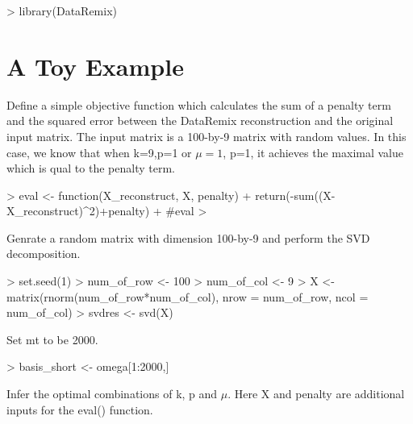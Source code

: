 \documentclass{article}
\begin{document}


\begin{Schunk}
\begin{Sinput}
> library(DataRemix)
\end{Sinput}
\end{Schunk}
\section{A Toy Example}
Define a simple objective function which calculates the sum of a penalty term and the squared error between the DataRemix reconstruction and the original input matrix. The input matrix is a 100-by-9 matrix with random values. In this case, we know that when k=9,p=1 or $\mu=1$, p=1, it achieves the maximal value which is qual to the penalty term.
\begin{Schunk}
\begin{Sinput}
> eval <- function(X_reconstruct, X, penalty){
+   return(-sum((X-X_reconstruct)^2)+penalty)
+ }#eval
> 
\end{Sinput}
\end{Schunk}
Genrate a random matrix with dimension 100-by-9 and perform the SVD decomposition.
\begin{Schunk}
\begin{Sinput}
> set.seed(1)
> num_of_row <- 100
> num_of_col <- 9
> X <- matrix(rnorm(num_of_row*num_of_col), nrow = num_of_row, ncol = num_of_col)
> svdres <- svd(X)
\end{Sinput}
\end{Schunk}
Set mt to be 2000.
\begin{Schunk}
\begin{Sinput}
> basis_short <- omega[1:2000,]
\end{Sinput}
\end{Schunk}
Infer the optimal combinations of k, p and $\mu$. Here X and penalty are additional inputs for the eval() function.
\end{document}
